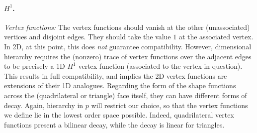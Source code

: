 \paragraph{$H^1$.}
\textit{Vertex functions:}
The vertex functions should vanish at the other (unassociated) vertices and disjoint edges.
They should take the value $1$ at the associated vertex.
In 2D, at this point, this does \textit{not} guarantee compatibility.
However, dimensional hierarchy requires the (nonzero) trace of vertex functions over the adjacent edges to be precisely a 1D $H^1$ vertex function (associated to the vertex in question).
This results in full compatibility, and implies the 2D vertex functions are extensions of their 1D analogues.
Regarding the form of the shape functions across the (quadrilateral or triangle) face itself, they can have different forms of decay.
Again, hierarchy in $p$ will restrict our choice, so that the vertex functions we define lie in the lowest order space possible.
Indeed, quadrilateral vertex functions present a bilinear decay, while the decay is linear for triangles.

